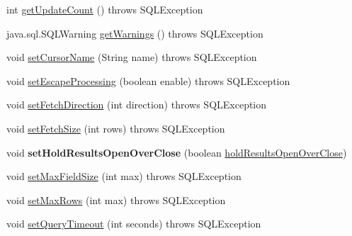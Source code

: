 \begin{DoxyCompactItemize}
\item 
int \mbox{\hyperlink{classcom_1_1mysql_1_1cj_1_1jdbc_1_1_statement_impl_abb1d31f01f22e76a4d2a03c26905cb2e}{get\+Update\+Count}} ()  throws S\+Q\+L\+Exception 
\item 
java.\+sql.\+S\+Q\+L\+Warning \mbox{\hyperlink{classcom_1_1mysql_1_1cj_1_1jdbc_1_1_statement_impl_aeeda73d9ee01ed8c74d90c4014614412}{get\+Warnings}} ()  throws S\+Q\+L\+Exception 
\item 
void \mbox{\hyperlink{classcom_1_1mysql_1_1cj_1_1jdbc_1_1_statement_impl_a60cd7b41aa7098febdb3f9af3aa40423}{set\+Cursor\+Name}} (String name)  throws S\+Q\+L\+Exception 
\item 
void \mbox{\hyperlink{classcom_1_1mysql_1_1cj_1_1jdbc_1_1_statement_impl_a177506cc06af0885ffceef360e697bb0}{set\+Escape\+Processing}} (boolean enable)  throws S\+Q\+L\+Exception 
\item 
void \mbox{\hyperlink{classcom_1_1mysql_1_1cj_1_1jdbc_1_1_statement_impl_a5f61e150957f4bdfa9682061008d448f}{set\+Fetch\+Direction}} (int direction)  throws S\+Q\+L\+Exception 
\item 
void \mbox{\hyperlink{classcom_1_1mysql_1_1cj_1_1jdbc_1_1_statement_impl_ad68efa27b29ed10cdc35f711dad0d16f}{set\+Fetch\+Size}} (int rows)  throws S\+Q\+L\+Exception 
\item 
\mbox{\label{classcom_1_1mysql_1_1cj_1_1jdbc_1_1_statement_impl_a903fdf158910d8f86a7417699ac93064}} 
void {\bfseries set\+Hold\+Results\+Open\+Over\+Close} (boolean \mbox{\hyperlink{classcom_1_1mysql_1_1cj_1_1jdbc_1_1_statement_impl_a3313b50d4d597415d14dedd1620de480}{hold\+Results\+Open\+Over\+Close}})
\item 
void \mbox{\hyperlink{classcom_1_1mysql_1_1cj_1_1jdbc_1_1_statement_impl_ab0013f973a2fe60cb9cdbfa6f53486e6}{set\+Max\+Field\+Size}} (int max)  throws S\+Q\+L\+Exception 
\item 
void \mbox{\hyperlink{classcom_1_1mysql_1_1cj_1_1jdbc_1_1_statement_impl_ab0226070ba29ae3c0cf7431d7b902c01}{set\+Max\+Rows}} (int max)  throws S\+Q\+L\+Exception 
\item 
void \mbox{\hyperlink{classcom_1_1mysql_1_1cj_1_1jdbc_1_1_statement_impl_a4bc4a551083ec1e3a3cabcea2da922ad}{set\+Query\+Timeout}} (int seconds)  throws S\+Q\+L\+Exception 
\item 
\mbox{\label{classcom_1_1mysql_1_1cj_1_1jdbc_1_1_statement_impl_affaded3f0d3bc5a4ff0d80928ddfd8bc}} 

\end{DoxyCompactItemize}
